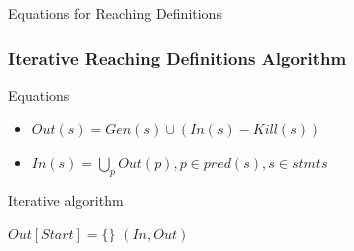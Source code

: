 \begin{frame}{Equations for Reaching Definitions}
\end{frame}

\begin{frame}[fragile]
  \frametitle{Iterative Reaching Definitions Algorithm}

  \begin{block}{Equations}
    \begin{itemize}
    \item $Out(s) = Gen(s) \cup (In(s) - Kill(s))$  
    \item $In(s) = \bigcup_p Out(p), p \in pred(s), s \in stmts$
    \end{itemize}
  \end{block}

  \pause

\begin{block}{Iterative algorithm}
  \begin{algorithmic}
     \State $Out[Start] = \{\}$ 
     \EndFor
       \EndFor
     \EndWhile
     $(In, Out)$
    \EndProcedure 
  \end{algorithmic}
\end{block}
\end{frame}



